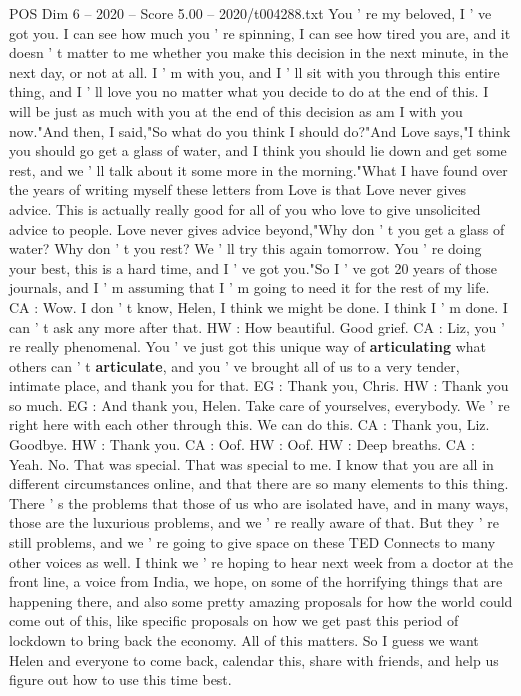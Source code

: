 \begin{textsample}{POS Dim 6 – 2020 – Score 5.00 – 2020/t004288.txt}
You ' re my beloved, I ' ve got you.
I can see how much you ' re spinning, I can see how tired you are, and it doesn ' t matter to me whether you make this decision in the next minute, in the next day, or not at all.
I ' m with you, and I ' ll sit with you through this entire thing, and I ' ll love you no matter what you decide to do at the end of this.
I will be just as much with you at the end of this decision as am I with you now."And then, I said,"So what do you think I should do?"And Love says,"I think you should go get a glass of water, and I think you should lie down and get some rest, and we ' ll talk about it some more in the morning."What I have found over the years of writing myself these letters from Love is that Love never gives advice.
This is actually really good for all of you who love to give unsolicited advice to people.
Love never gives advice beyond,"Why don ' t you get a glass of water?
Why don ' t you rest?
We ' ll try this again tomorrow.
You ' re doing your best, this is a hard time, and I ' ve got you."So I ' ve got 20 years of those journals, and I ' m assuming that I ' m going to need it for the rest of my life.
CA : Wow.
I don ' t know, Helen, I think we might be done.
I think I ' m done.
I can ' t ask any more after that.
HW : How beautiful.
Good grief.
CA : Liz, you ' re really phenomenal.
You ' ve just got this unique way of \textbf{articulating} what others can ' t \textbf{articulate}, and you ' ve brought all of us to a very tender, intimate place, and thank you for that.
EG : Thank you, Chris.
HW : Thank you so much.
EG : And thank you, Helen.
Take care of yourselves, everybody.
We ' re right here with each other through this.
We can do this.
CA : Thank you, Liz.
Goodbye.
HW : Thank you.
CA : Oof.
HW : Oof.
HW : Deep breaths.
CA : Yeah.
No.
That was special.
That was special to me.
I know that you are all in different circumstances online, and that there are so many elements to this thing.
There ' s the problems that those of us who are isolated have, and in many ways, those are the luxurious problems, and we ' re really aware of that.
But they ' re still problems, and we ' re going to give space on these TED Connects to many other voices as well.
I think we ' re hoping to hear next week from a doctor at the front line, a voice from India, we hope, on some of the horrifying things that are happening there, and also some pretty amazing proposals for how the world could come out of this, like specific proposals on how we get past this period of lockdown to bring back the economy.
All of this matters.
So I guess we want Helen and everyone to come back, calendar this, share with friends, and help us figure out how to use this time best.

\end{textsample}
